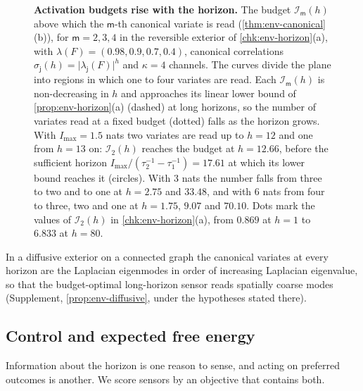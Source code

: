 \begin{figure}[t]
  \centering
  
  \caption{\textbf{Activation budgets rise with the horizon.} The budget $\mathcal I_{\mathsf m}(h)$ above which the $\mathsf m$-th canonical variate is read (\cref{thm:env-canonical}(b)), for $\mathsf m=2,3,4$ in the reversible exterior of \cref{chk:env-horizon}(a), with $\lambda(F)=(0.98,0.9,0.7,0.4)$, canonical correlations $\sigma_{\mathsf j}(h)=\lvert\lambda_{\mathsf j}(F)\rvert^h$ and $\kappa=4$ channels. The curves divide the plane into regions in which one to four variates are read. Each $\mathcal I_{\mathsf m}(h)$ is non-decreasing in $h$ and approaches its linear lower bound of \cref{prop:env-horizon}(a) (dashed) at long horizons, so the number of variates read at a fixed budget (dotted) falls as the horizon grows. With $I_{\max}=1.5$ nats two variates are read up to $h=12$ and one from $h=13$ on: $\mathcal I_2(h)$ reaches the budget at $h=12.66$, before the sufficient horizon $I_{\max}/(\tau_2^{-1}-\tau_1^{-1})=17.61$ at which its lower bound reaches it (circles). With $3$ nats the number falls from three to two and to one at $h=2.75$ and $33.48$, and with $6$ nats from four to three, two and one at $h=1.75$, $9.07$ and $70.10$. Dots mark the values of $\mathcal I_2(h)$ in \cref{chk:env-horizon}(a), from $0.869$ at $h=1$ to $6.833$ at $h=80$.}
  \label{fig:env-horizon}
\end{figure}

In a diffusive exterior on a connected graph the canonical variates at every horizon are the Laplacian eigenmodes in order of increasing Laplacian eigenvalue, so that the budget-optimal long-horizon sensor reads spatially coarse modes (Supplement, \cref{prop:env-diffusive}, under the hypotheses stated there).

\subsection{Control and expected free energy}\label{sec:env-control}

Information about the horizon is one reason to sense, and acting on preferred outcomes is another. We score sensors by an objective that contains both.

